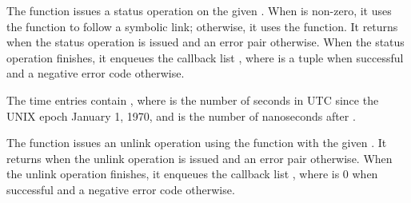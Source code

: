 \begin{function}
\end{function}

The  function issues a status operation on the
given . When  is non-zero, it uses the
 function to follow a symbolic link; otherwise, it
uses the  function. It returns  when the
status operation is issued and an error pair otherwise. When the
status operation finishes, it enqueues the callback list
, where  is a
 tuple when successful and a negative error code
otherwise.

\begin{tuple}\end{tuple}\antipar
\begin{argtbl}
\end{argtbl}

The time entries contain , where
 is the number of seconds in UTC since the UNIX epoch January
1, 1970, and  is the number of nanoseconds after .

\begin{function}
\end{function}

The  function issues an unlink operation using the
 function with the given . It returns
 when the unlink operation is issued and an error pair
otherwise. When the unlink operation finishes, it enqueues the
callback list , where 
is 0 when successful and a negative error code otherwise.

